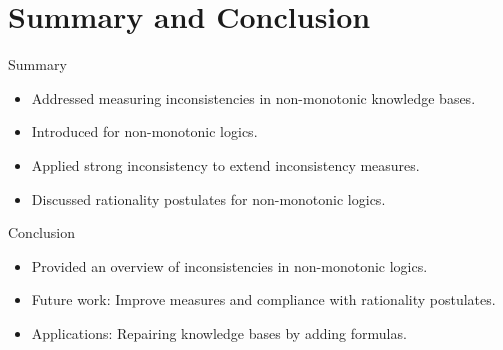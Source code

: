\section{Summary and Conclusion}

\begin{frame}{Summary}
    \begin{itemize}
        \item Addressed measuring inconsistencies in non-monotonic knowledge bases.
        \item Introduced  for non-monotonic logics.
        \item Applied strong inconsistency to extend inconsistency measures.
        \item Discussed rationality postulates for non-monotonic logics.
    \end{itemize}
\end{frame}

\begin{frame}{Conclusion}
    \begin{itemize}
        \item Provided an overview of inconsistencies in non-monotonic logics.
        \item Future work: Improve measures and compliance with rationality postulates.
        \item Applications: Repairing knowledge bases by adding formulas.
    \end{itemize}
\end{frame}
